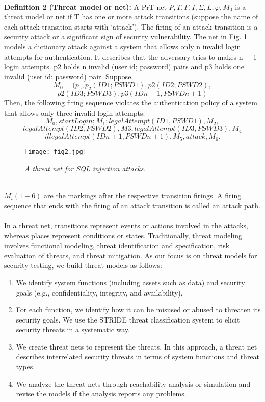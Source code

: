 \paragraph{}
\textbf{Definition 2 (Threat model or net):} A PrT net $P,T,F,I,\Sigma,L,\varphi,M_0$  is a threat model or net if T has one or more attack transitions (suppose the name of each attack transition starts with \lq attack\rq). The firing of an attack transition is a security attack or a significant sign of security vulnerability. The net in Fig. 1 models a dictionary attack against a
system that allows only n invalid login attempts for authentication. It describes that the adversary tries to makes n + 1 login attempts. p2 holds n invalid (user id; password) pairs and p3 holds one invalid (user id; password) pair.
Suppose, $$
M_0=(p_0,p_2(ID1; PSWD1), p2(ID2; PSWD2),$$  
       $$p2(ID3; PSWD3), p3(IDn + 1,PSWDn+1)
$$
Then, the following firing sequence violates the authentication policy of a system that allows only three invalid login
attempts:
$$M_0,startLogin; M_1 ; legalAttempt(ID1, PSWD1),M_2,$$
$$legalAttempt(ID2,PSWD2),M3,legalAttempt(ID3,PSWD3), M_4$$
$$ illegalAttempt(IDn + 1,PSWDn + 1), M_5, attack, M_6.$$
\begin{figure}
\centering
\texttt{[image: fig2.jpg]}
\caption{\textit{A threat net for SQL injection attacks.}}
\label{fig:2}
\end{figure}
\\
$M_i(1 - 6)$ are the markings after the respective transition
firings. A firing sequence that ends with the firing of an
attack transition is called an attack path.
\paragraph{}
In a threat net, transitions represent events or actions involved in the attacks, whereas places represent conditions or states. Traditionally, threat modeling involves functional modeling, threat identification and specification, risk evaluation of threats, and threat mitigation. As our focus is on threat models for security testing, we build threat models as follows: 
\begin{enumerate}
\item We identify system functions (including assets such as data) and security goals (e.g., confidentiality, integrity, and availability).
\item For each function, we identify how it can be misused or abused to threaten its security goals. We use the STRIDE threat classification system to elicit security threats in a systematic way.
\item We create threat nets to represent the threats. In this approach, a
threat net describes interrelated security threats in terms of system functions and threat types.
\item We analyze the threat nets through reachability analysis or simulation and
revise the models if the analysis reports any problems.
\end{enumerate}

